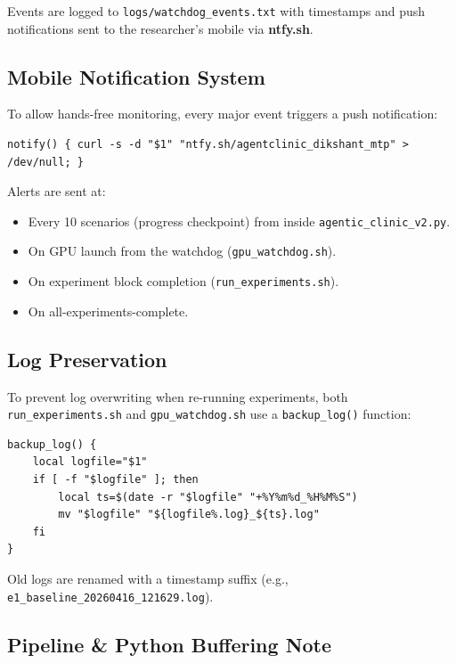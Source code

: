 \documentclass[12pt, a4paper]{article}
\begin{document}
\noindent Events are logged to \texttt{logs/watchdog\_events.txt} with timestamps and push notifications sent to the researcher's mobile via \textbf{ntfy.sh}.

\subsection{Mobile Notification System}

To allow hands-free monitoring, every major event triggers a push notification:

\begin{lstlisting}[style=bashstyle]
notify() { curl -s -d "$1" "ntfy.sh/agentclinic_dikshant_mtp" > /dev/null; }
\end{lstlisting}

Alerts are sent at:
\begin{itemize}
    \item Every 10 scenarios (progress checkpoint) from inside \texttt{agentic\_clinic\_v2.py}.
    \item On GPU launch from the watchdog (\texttt{gpu\_watchdog.sh}).
    \item On experiment block completion (\texttt{run\_experiments.sh}).
    \item On all-experiments-complete.
\end{itemize}

\subsection{Log Preservation}

To prevent log overwriting when re-running experiments, both \texttt{run\_experiments.sh} and \texttt{gpu\_watchdog.sh} use a \texttt{backup\_log()} function:

\begin{lstlisting}[style=bashstyle]
backup_log() {
    local logfile="$1"
    if [ -f "$logfile" ]; then
        local ts=$(date -r "$logfile" "+%Y%m%d_%H%M%S")
        mv "$logfile" "${logfile%.log}_${ts}.log"
    fi
}
\end{lstlisting}

\noindent Old logs are renamed with a timestamp suffix (e.g., \texttt{e1\_baseline\_20260416\_121629.log}).

\subsection{Pipeline \& Python Buffering Note}
\end{document}
